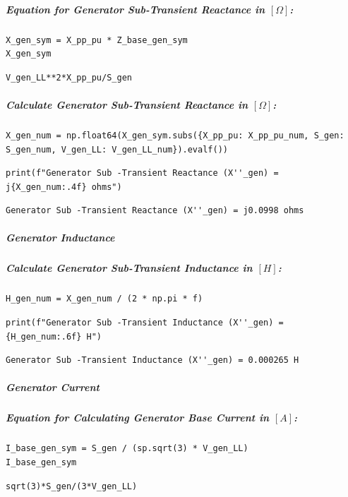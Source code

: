 \subparagraph{Equation for Generator Sub-Transient Reactance in $\left[\Omega\right]$:}

\begin{verbatim}
X_gen_sym = X_pp_pu * Z_base_gen_sym
X_gen_sym
\end{verbatim}

\begin{verbatim}
V_gen_LL**2*X_pp_pu/S_gen
\end{verbatim}

\subparagraph{Calculate Generator Sub-Transient Reactance in $\left[\Omega\right]$:}

\begin{verbatim}
X_gen_num = np.float64(X_gen_sym.subs({X_pp_pu: X_pp_pu_num, S_gen: S_gen_num, V_gen_LL: V_gen_LL_num}).evalf())
\end{verbatim}

\begin{verbatim}
print(f"Generator Sub -Transient Reactance (X''_gen) = j{X_gen_num:.4f} ohms")
\end{verbatim}

\begin{verbatim}
Generator Sub -Transient Reactance (X''_gen) = j0.0998 ohms
\end{verbatim}

\subparagraph{Generator Inductance}

\subparagraph{Calculate Generator Sub-Transient Inductance in $\left[H\right]$:}

\begin{verbatim}
H_gen_num = X_gen_num / (2 * np.pi * f)
\end{verbatim}

\begin{verbatim}
print(f"Generator Sub -Transient Inductance (X''_gen) = {H_gen_num:.6f} H")
\end{verbatim}

\begin{verbatim}
Generator Sub -Transient Inductance (X''_gen) = 0.000265 H
\end{verbatim}

\subparagraph{Generator Current}

\subparagraph{Equation for Calculating Generator Base Current in $\left[A\right]$:}

\begin{verbatim}
I_base_gen_sym = S_gen / (sp.sqrt(3) * V_gen_LL)
I_base_gen_sym
\end{verbatim}

\begin{verbatim}
sqrt(3)*S_gen/(3*V_gen_LL)
\end{verbatim}

